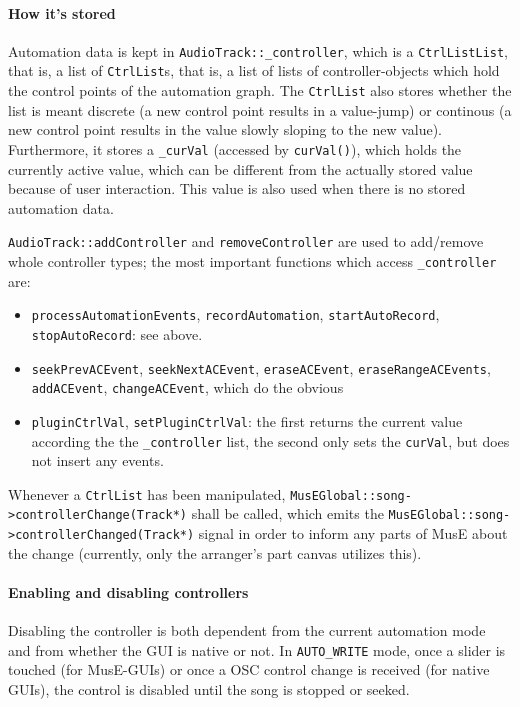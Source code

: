 \documentclass[a4paper]{report}
\newcommand{\sym}[1]{\texttt{#1}}
\begin{document}
\paragraph{How it's stored}
Automation data is kept                                                  %
in \sym{AudioTrack::\_controller}, which is a \sym{CtrlListList},        %
that is, a list of \sym{CtrlList}s, that is, a list of lists of
controller-objects which hold the control points of the automation graph.
The \sym{CtrlList} also stores whether the list is meant discrete
(a new control point results in a value-jump) or continous (a new control
point results in the value slowly sloping to the new value).
Furthermore, it stores a \sym{\_curVal} (accessed by \sym{curVal()}),
which holds the currently active value, which can be different from the
actually stored value because of user interaction. This value is also
used when there is no stored automation data.

\sym{AudioTrack::addController} and \sym{removeController} are used        %
to add/remove whole controller types; the most important functions which
access \sym{\_controller} are:
\begin{itemize}
\item \sym{processAutomationEvents}, \sym{recordAutomation},
      \sym{startAutoRecord}, \sym{stopAutoRecord}: see above.
\item \sym{seekPrevACEvent}, \sym{seekNextACEvent}, \sym{eraseACEvent},
      \sym{eraseRangeACEvents}, \sym{addACEvent}, \sym{changeACEvent},
      which do the obvious
\item \sym{pluginCtrlVal}, \sym{setPluginCtrlVal}: the first
      returns the current value according the the \sym{\_controller}
      list, the second only sets the \sym{curVal}, but does not
      insert any events.
\end{itemize}

Whenever a \sym{CtrlList} has been manipulated,
\sym{MusEGlobal::song->controllerChange(Track*)} shall be called,
which emits the \sym{MusEGlobal::song->controllerChanged(Track*)}
signal in order to inform any parts of MusE about the change (currently,
only the arranger's part canvas utilizes this).

\paragraph{Enabling and disabling controllers}
Disabling the controller is both dependent from the current automation
mode and from whether the GUI is native or not.
In \sym{AUTO\_WRITE} mode, once a slider is touched (for MusE-GUIs) or
once a OSC control change is received (for native GUIs), the control
is disabled until the song is stopped or seeked.
\end{document}
